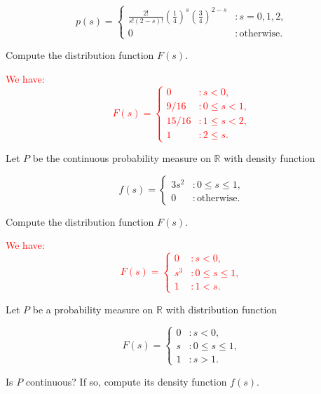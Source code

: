 \documentclass[12pt,reqno]{amsart}
\begin{document}
	\[
	p(s) = \begin{cases}
	\frac{2!}{s!(2-s)!} \left( \frac{1}{4} \right)^s \left(\frac{3}{4} \right)^{2-s} & : s=0, 1, 2, \\
	0 & :\text{otherwise}.
	\end{cases}
	\]

Compute the distribution function $F(s)$.

\bigskip
\textcolor{red}{We have:
	\[
	F(s) = \begin{cases}
	0 & : s < 0, \\
	9/16 & : 0 \leq s < 1, \\
	15/16 & : 1 \leq s < 2, \\
	1 & : 2\leq s.
	\end{cases}
	\]}













\bigskip
\prob Let $P$ be the continuous probability measure on $\mathbb{R}$ with density function

	\[
	f(s) = \begin{cases}
	3s^2 & : 0 \leq s \leq 1, \\
	0 & : \text{otherwise}.
	\end{cases}
	\]

Compute the distribution function $F(s)$.

\bigskip
\textcolor{red}{We have:
	\[
	F(s) = \begin{cases}
	0 & : s < 0, \\
	s^3 & : 0 \leq s \leq 1, \\
	1 & : 1 < s.
	\end{cases}
	\]}













\bigskip
\prob Let $P$ be a probability measure on $\mathbb{R}$ with distribution function

	\[
	F(s) = \begin{cases}
	0 & : s < 0, \\
	s & : 0\leq s \leq 1, \\
	1 & : s>1.
	\end{cases}
	\]

Is $P$ continuous? If so, compute its density function $f(s)$.
\end{document}

